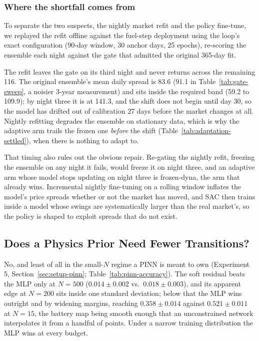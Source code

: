 \documentclass[conference]{IEEEtran}
\begin{document}
\subsubsection{Where the shortfall comes from}
\label{sec:results-discussion-sub}

To separate the two suspects, the nightly market refit and the policy fine-tune, we replayed the refit offline against the fuel-step deployment using the loop's exact configuration (90-day window, 30 anchor days, 25 epochs), re-scoring the ensemble each night against the gate that admitted the original 365-day fit.

The refit leaves the gate on its third night and never returns across the remaining 116. The original ensemble's mean daily spread is 83.6 (91.1 in Table~\ref{tab:gate-sweep}, a noisier 3-year measurement) and sits inside the required band (59.2 to 109.9); by night three it is at 141.3, and the shift does not begin until day 30, so the model has drifted out of calibration 27 days before the market changes at all. Nightly refitting degrades the ensemble on stationary data, which is why the adaptive arm trails the frozen one \emph{before} the shift (Table~\ref{tab:adaptation-settled}), when there is nothing to adapt to.

That timing also rules out the obvious repair. Re-gating the nightly refit, freezing the ensemble on any night it fails, would freeze it on night three, and an adaptive arm whose model stops updating on night three is frozen-dyna, the arm that already wins. Incremental nightly fine-tuning on a rolling window inflates the model's price spreads whether or not the market has moved, and SAC then trains inside a model whose swings are systematically larger than the real market's, so the policy is shaped to exploit spreads that do not exist.

\subsection{Does a Physics Prior Need Fewer Transitions?}
\label{sec:results-pinn}

No, and least of all in the small-$N$ regime a PINN is meant to own (Experiment 5, Section~\ref{sec:setup-pinn}; Table~\ref{tab:pinn-accuracy}). The soft residual beats the MLP only at $N{=}500$ ($0.014\pm0.002$ vs.\ $0.018\pm0.003$), and its apparent edge at $N{=}200$ sits inside one standard deviation; below that the MLP wins outright and by widening margins, reaching $0.358\pm0.014$ against $0.521\pm0.011$ at $N{=}15$, the battery map being smooth enough that an unconstrained network interpolates it from a handful of points. Under a narrow training distribution the MLP wins at every budget.
\end{document}
